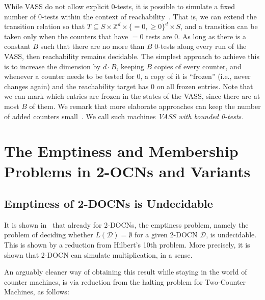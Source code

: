 \documentclass[11pt,a4paper]{amsart}
\theoremstyle{definition}
\newcommand{\bbZ}{\mathbb{Z}}
\newcommand{\cD}{\mathcal{D}}
\begin{document}
	While VASS do not allow explicit 0-tests, it is possible to simulate a fixed
	number of 0-tests within the context of
	reachability~\cite{czerwinski2020reachability,czerwinski2022reachability}. That
	is, we can extend the transition relation so that $T\subseteq S\times \bbZ^d\times \{=0,\ge 0\}^d \times
	S$, and a transition can be taken only when the counters that have $=0$ tests
	are 0. As long as there is a constant \(B\) such that there are no more than $B$
	0-tests along every run of the VASS, then reachability remains decidable.  The
	simplest approach to achieve this is to increase the dimension by $d\cdot B$,
	keeping $B$ copies of every counter, and whenever a counter needs to be tested
	for 0, a copy of it is ``frozen'' (i.e., never changes again) and the
	reachability target has $0$ on all frozen entries. Note that we can mark which
	entries are frozen in the states of the VASS, since there are at most $B$ of
	them. We remark that more elaborate approaches can keep the number of added
	counters small~\cite{czerwinski2020reachability,czerwinski2022reachability}.  We
	call such machines \emph{VASS with bounded 0-tests}.
	
	\section{The Emptiness and Membership Problems in 2-OCNs and Variants}
	\subsection{Emptiness of 2-DOCNs is Undecidable}
	\label{sec:DOCN_undec}
	It is shown in~\cite{chan1987two} that already for 2-DOCNs, the emptiness problem, namely the problem of deciding whether $L(\cD)= \emptyset$ for a given 2-DOCN $\cD$, is undecidable. This is shown by a reduction from Hilbert's 10th problem. More precisely, it is shown that 2-DOCN can simulate multiplication, in a sense.
	
	An arguably cleaner way of obtaining this result while staying in the world of
	counter machines, is via reduction from the halting problem for Two-Counter
	Machines, as follows:
	
\end{document}

